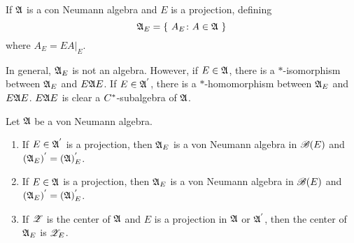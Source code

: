 \begin{defn}
	If $\mathfrak{A}$ is a con Neumann algebra and $E$ is a projection, defining
	\begin{equation*}
		\mathfrak{A}_{E} = \{~A_E \colon A \in \mathfrak{A}~\}
	\end{equation*}
	where $A_E = EA|_E$.
\end{defn}
\begin{rem}
	In general, $\mathfrak{A}_E$ is not an algebra. However, if $E \in \mathfrak{A}$, there is a $*$-isomorphism between $\mathfrak{A}_E$ and $E\mathfrak{A} E$. If $E \in \mathfrak{A}^{'}$, there is a $*$-homomorphism between $\mathfrak{A}_E$ and $E\mathfrak{A} E$. $E \mathfrak{A} E$ is clear a $C^{*}$-subalgebra of $\mathfrak{A}$.
\end{rem}

\begin{prop}
	Let $\mathfrak{A}$ be a von Neumann algebra.
	\begin{enumerate}[label=\arabic*)]
		\item If $E \in \mathfrak{A}^{'}$ is a projection, then $\mathfrak{A}_E$ is a von Neumann algebra in $\mathscr{B}(E)$ and $(\mathfrak{A}_E)^{'} = (\mathfrak{A})^{'}_E$.
		\item If $E \in \mathfrak{A}$ is a projection, then $\mathfrak{A}_E$ is a von Neumann algebra in $\mathscr{B}(E)$ and $(\mathfrak{A}_E)^{'} = (\mathfrak{A})^{'}_E$.
		\item If $\mathscr{Z}$ is the center of $\mathfrak{A}$ and $E$ is a projection in $\mathfrak{A}$ or $\mathfrak{A}^{'}$, then the center of $\mathfrak{A}_E$ is $\mathscr{Z}_E$.
	\end{enumerate}
\end{prop}
